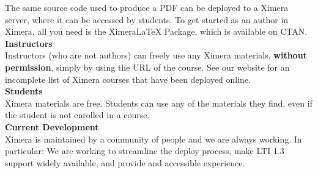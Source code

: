 \documentclass{article}
\begin{document}
\begin{multicols}{2}
\begin{center}
\begin{tikzpicture}
        \end{tikzpicture}
    \end{center}
    The same source code used to produce a PDF can be deployed to a Ximera server, where it can be accessed by students.
    To get started as an author in Ximera, all you need is the XimeraLaTeX
    Package, which is available on CTAN.
    \\[.5cm]
    {\sffamily\bfseries Instructors}\\
    Instructors (who are not authors) can freely use any Ximera materials,
    \textbf{without permission}, simply by using the URL of the
    course. See our website for an incomplete list of Ximera
    courses that have been
    deployed online.
    \\[.5cm]
    {\sffamily\bfseries Students}\\
    Ximera materials are free. Students can use any of the materials they
    find, even if the student is not enrolled in a course.
    \\[.5cm]
    {\sffamily\bfseries Current Development}\\
    Ximera is maintained by a community of people and we are always working. In
    particular: We are working to streamline the deploy process,
    make LTI 1.3 support widely available, and provide and accessible experience.
    \begin{center}
    \end{center}




\end{multicols}
\end{document}
